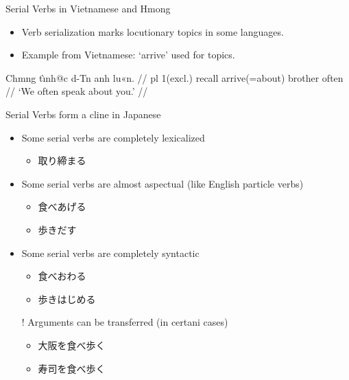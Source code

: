 \documentclass{beamer}
\begin{document}
\begin{frame}{Serial Verbs in Vietnamese and Hmong}
\begin{itemize}
    \item Verb serialization marks locutionary topics in some languages.
    \item Example from Vietnamese: ‘arrive’ used for topics.
\end{itemize}
\ex
\begingl
\gla Chmng t\`\i nh@c d-Tn anh lu«n. //
\glb pl 1(excl.) recall arrive(=about) brother often //
\glft ‘We often speak about you.’ //
\endgl
\xe
\end{frame}
\begin{frame}{Serial Verbs form a cline in Japanese}
  
\begin{itemize}
\item Some serial verbs are completely lexicalized
  \begin{itemize}
  \item 取り締まる 
  \end{itemize}
\item Some serial verbs are almost aspectual (like English particle verbs)
  \begin{itemize}
  \item 食べあげる 
  \item 歩きだす  
  \end{itemize}
\item Some serial verbs are completely syntactic
  \begin{itemize}
  \item 食べおわる 
  \item 歩きはじめる 
  \end{itemize}
\item [!] Arguments can be transferred (in certani cases)
  \begin{itemize}
  \item 大阪を食べ歩く 
  \item 寿司を食べ歩く 
  \end{itemize}
\end{itemize}
\citep{Hashimoto:Bond:2005}
\end{frame}
\end{document}
